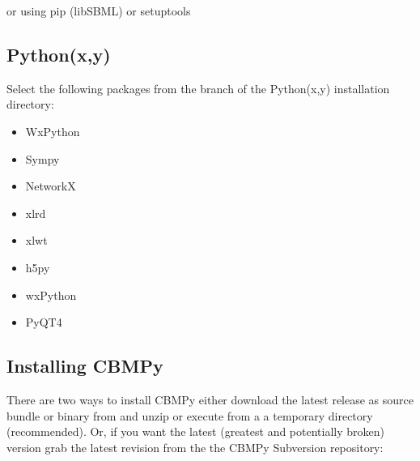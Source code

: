 \documentclass[letterpaper,10pt,english]{sphinxmanual}
\begin{document}
\sphinxAtStartPar
or using pip (libSBML) or setuptools


\subsection{Python(x,y)}
\label{\detokenize{install_doc:python-x-y}}
\sphinxAtStartPar
Select the following packages from the  branch of the Python(x,y) installation directory:
\begin{itemize}
\item {} 
\sphinxAtStartPar
WxPython

\item {} 
\sphinxAtStartPar
Sympy

\item {} 
\sphinxAtStartPar
NetworkX

\item {} 
\sphinxAtStartPar
xlrd

\item {} 
\sphinxAtStartPar
xlwt

\item {} 
\sphinxAtStartPar
h5py

\item {} 
\sphinxAtStartPar
wxPython

\item {} 
\sphinxAtStartPar
PyQT4

\end{itemize}


\subsection{Installing CBMPy}
\label{\detokenize{install_doc:installing-cbmpy}}
\sphinxAtStartPar
There are two ways to install CBMPy either download the latest release as
source bundle or binary from  and unzip or execute from a
a temporary directory (recommended). Or, if you want the latest
(greatest and potentially broken) version grab the latest revision from the
the CBMPy Subversion repository:

\begin{sphinxVerbatim}[commandchars=\\\{\}]
   
\end{sphinxVerbatim}
\end{document}
